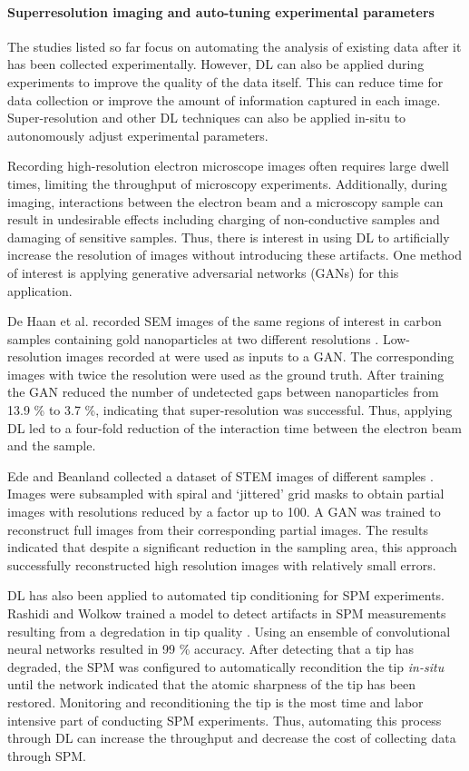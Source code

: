 \documentclass[pdflatex,sn-mathphys]{sn-jnl}%
\theoremstyle{thmstyleone}%
\theoremstyle{thmstyletwo}%
\theoremstyle{thmstylethree}%
\begin{document}
\paragraph{Superresolution imaging and auto-tuning experimental parameters}

The studies listed so far focus on automating the analysis of existing data after it has been collected experimentally. However, DL can also be applied during experiments to improve the quality of the data itself. This can reduce time for data collection or improve the amount of information captured in each image. Super-resolution and other DL techniques can also be applied in-situ to autonomously adjust experimental parameters. 

Recording high-resolution electron microscope images often requires large dwell times, limiting the throughput of microscopy experiments. Additionally, during imaging, interactions between the electron beam and a microscopy sample can result in undesirable effects including charging of non-conductive samples and damaging of sensitive samples. Thus, there is interest in using DL to artificially increase the resolution of images without introducing these artifacts. One method of interest is applying generative adversarial networks (GANs) for this application.

De Haan et al. recorded SEM images of the same regions of interest in carbon samples containing gold nanoparticles at two different resolutions \cite{de2019resolution}. Low-resolution images recorded at were used as inputs to a GAN.  The corresponding images with twice the resolution were used as the ground truth. After training the GAN reduced the number of undetected gaps between nanoparticles from 13.9 \% to 3.7 \%, indicating that super-resolution was successful. Thus, applying DL led to a four-fold reduction of the interaction time between the electron beam and the sample.

Ede and Beanland collected a dataset of STEM images of different samples \cite{Ede2020}. Images were subsampled with spiral and `jittered' grid masks to obtain partial images with resolutions reduced by a factor up to 100.  A GAN was trained to reconstruct full images from their corresponding partial images. The results indicated that despite a significant reduction in the sampling area, this approach successfully reconstructed high resolution images with relatively small errors. 

DL has also been applied to automated tip conditioning for SPM experiments. Rashidi and Wolkow trained a model to detect artifacts in SPM measurements resulting from a degredation in tip quality \cite{rashidi2018autonomous}. Using an ensemble of convolutional neural networks resulted in 99 \% accuracy. After detecting that a tip has degraded, the SPM was configured to automatically recondition the tip \emph{in-situ} until the network indicated that the atomic sharpness of the tip has been restored. Monitoring and reconditioning the tip is the most time and labor intensive part of conducting SPM experiments. Thus, automating this process through DL can increase the throughput and decrease the cost of collecting data through SPM.
\end{document}
